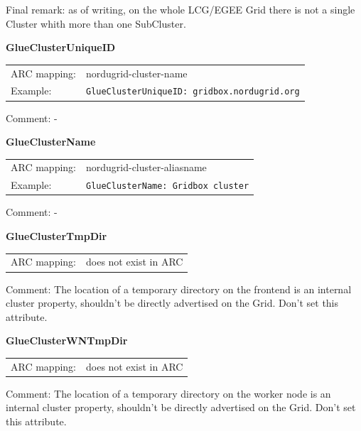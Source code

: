 \documentclass{article}
\begin{document}
Final remark: as of writing, on the whole LCG/EGEE Grid 
there is not a single Cluster whith more than one SubCluster.


\hspace*{0.5cm}
\begin{shaded}
 \textbf{GlueClusterUniqueID}
\end{shaded}
\begin{tabular}{lp{10cm}}  
  ARC mapping:& nordugrid-cluster-name\\
  Example:& \verb#GlueClusterUniqueID: gridbox.nordugrid.org#\\
\end{tabular}

Comment: -


\hspace*{0.5cm}
\begin{shaded}
 \textbf{GlueClusterName} 
\end{shaded}
\begin{tabular}{lp{10cm}}  
  ARC mapping:& nordugrid-cluster-aliasname\\
  Example:& \verb#GlueClusterName: Gridbox cluster#\\
\end{tabular}

Comment: -


\hspace*{0.5cm}
\begin{shaded}
 \textbf{GlueClusterTmpDir} 
\end{shaded}
\begin{tabular}{lp{10cm}}  
  ARC mapping:& does not exist in ARC\\ 
\end{tabular}

Comment: The location of a temporary directory on the frontend is an internal 
cluster property, shouldn't be directly advertised on the Grid. 
Don't set this attribute.


\hspace*{0.5cm}
\begin{shaded}
 \textbf{GlueClusterWNTmpDir} 
\end{shaded}
\begin{tabular}{lp{10cm}}  
  ARC mapping:& does not exist in ARC\\
\end{tabular}

Comment: The location of a temporary directory on the worker node is an internal 
cluster property, shouldn't be directly advertised on the Grid. 
Don't set this attribute.
\end{document}
